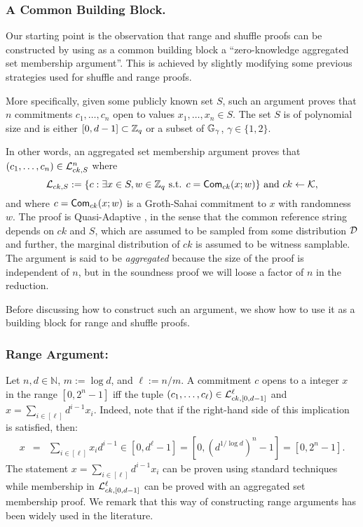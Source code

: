 \subsubsection{A Common Building Block.} Our starting point is the observation that range and shuffle proofs can be constructed by using as a common building block a 
``zero-knowledge aggregated set membership argument''. This is achieved by slightly modifying some previous strategies used for shuffle and range proofs.

More specifically,  given some publicly known set $S$, such an argument proves that $n$ commitments $c_1,\ldots,c_n$ open to values $x_1,\ldots,x_n \in S$.  The set $S$ is of polynomial size and is either $[0,d-1]\subset\mathbb{Z}_q$ or a subset of $\mathbb{G}_\gamma$, $\gamma \in \{1,2\}$. 
 
In other words, an aggregated set membership argument proves that $(c_1,\ldots,c_n) \in \mathcal{L}_{ck,S}^n$ where 
$$
\mathcal{L}_{ck,S}:=\{c: \exists x\in S, w\in\mathbb{Z}_q \text{ s.t. } c=\mathsf{Com}_{ck}(x;w)\}\text{ and }ck\gets\mathcal{K},
$$
and where $c=\mathsf{Com}_{ck}(x;w)$ is a Groth-Sahai commitment to $x$ with randomness $w$. The proof is Quasi-Adaptive \cite{AC:JutRoy13}, in the sense that the common reference string depends on $ck$ and $S$, which are assumed to be sampled from some distribution $\mathcal{D}$
and further, the marginal distribution of $ck$ is assumed to be witness samplable. The argument is said to be \textit{aggregated} because the size of the proof is independent of $n$, but in the soundness proof we will loose a factor of $n$ in the reduction. 

Before discussing how to construct such an argument, we show how to use it as a building block for range and shuffle proofs.  
\subsubsection{Range Argument:}
Let $n,d\in\mathbb{N}$, $m:=\log d$, and $\ell:=n/m$. A commitment $c$ opens to a integer $x$ in the range $[0,2^n-1]$ iff the tuple $(c_1,\ldots,c_\ell) \in\mathcal{L}_{ck,[0,d-1]}^\ell$ and  $x=\sum_{i\in[\ell]}d^{i-1}x_i$. Indeed, note that if the right-hand side of this implication is satisfied, then: 
\begin{eqnarray*}
x & = & \sum_{i\in[\ell]} x_i d^{i-1}
   \in  [0,d^\ell-1]  =  [0,(d^{1/\log d})^n-1] = [0,2^n-1].
\end{eqnarray*}
The statement  $x=\sum_{i\in[\ell]}d^{i-1}x_i$ can be proven using standard techniques while membership in $\mathcal{L}_{ck,[0,d-1]}^\ell$ can be proved with an aggregated set membership proof. 
We remark that this way of constructing range arguments has been widely used in the literature.

